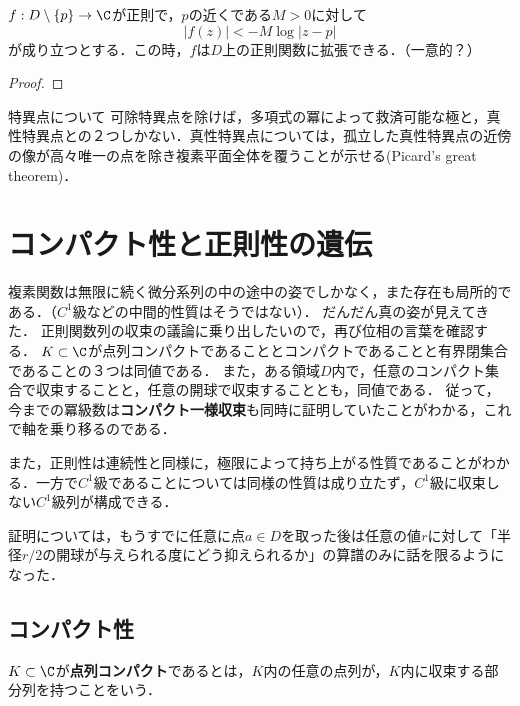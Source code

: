 \documentclass[uplatex, dvipdfmx]{jsreport}
\begin{document}
\begin{corollary}[除去可能特異点]
    $f:D\setminus\{p\}\to\C$が正則で，$p$の近くである$M>0$に対して
    \[ |f(z)|<-M\log|z-p| \]
    が成り立つとする．この時，$f$は$D$上の正則関数に拡張できる．（一意的？）
\end{corollary}
\begin{proof}
    
\end{proof}

\begin{itembox}[l]{特異点について}
    可除特異点を除けば，多項式の冪によって救済可能な極と，真性特異点との２つしかない．真性特異点については，孤立した真性特異点の近傍の像が高々唯一の点を除き複素平面全体を覆うことが示せる(Picard's great theorem)．
    
\end{itembox}

\section{コンパクト性と正則性の遺伝}

\begin{screen}
    複素関数は無限に続く微分系列の中の途中の姿でしかなく，また存在も局所的である．（$C^1$級などの中間的性質はそうではない）．
    だんだん真の姿が見えてきた．
    正則関数列の収束の議論に乗り出したいので，再び位相の言葉を確認する．
    $K\subset\C$が点列コンパクトであることとコンパクトであることと有界閉集合であることの３つは同値である．
    また，ある領域$D$内で，任意のコンパクト集合で収束することと，任意の開球で収束することとも，同値である．
    従って，今までの冪級数は\textbf{コンパクト一様収束}も同時に証明していたことがわかる，これで軸を乗り移るのである．

    また，正則性は連続性と同様に，極限によって持ち上がる性質であることがわかる．一方で$C^1$級であることについては同様の性質は成り立たず，$C^1$級に収束しない$C^1$級列が構成できる．

    証明については，もうすでに任意に点$a\in D$を取った後は任意の値$r$に対して「半径$r/2$の開球が与えられる度にどう抑えられるか」の算譜のみに話を限るようになった．
\end{screen}

\subsection{コンパクト性}

\begin{definition}
    $K\subset\C$が\textbf{点列コンパクト}であるとは，$K$内の任意の点列が，$K$内に収束する部分列を持つことをいう．
\end{definition}
\end{document}
